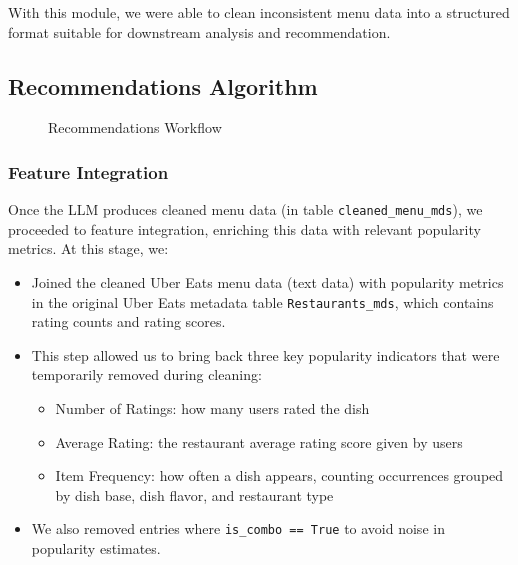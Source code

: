 \documentclass[
  11pt,
  a4paper,
  DIV=11,
  numbers=noendperiod]{scrartcl}
\providecommand{\tightlist}{%
  \setlength{\itemsep}{0pt}\setlength{\parskip}{0pt}}\usepackage{longtable,booktabs,array}
\begin{document}
With this module, we were able to clean inconsistent menu data into a
structured format suitable for downstream analysis and recommendation.

\subsection{Recommendations Algorithm}\label{recommendations-algorithm}

\begin{figure}

\caption{\label{fig-rec-flow}Recommendations Workflow}


\end{figure}%

\subsubsection{Feature Integration}\label{feature-integration}

Once the LLM produces cleaned menu data (in table
\texttt{cleaned\_menu\_mds}), we proceeded to feature integration,
enriching this data with relevant popularity metrics. At this stage, we:

\begin{itemize}
\tightlist
\item
  Joined the cleaned Uber Eats menu data (text data) with popularity
  metrics in the original Uber Eats metadata table
  \texttt{Restaurants\_mds}, which contains rating counts and rating
  scores.
\item
  This step allowed us to bring back three key popularity indicators
  that were temporarily removed during cleaning:

  \begin{itemize}
  \tightlist
  \item
    Number of Ratings: how many users rated the dish
  \item
    Average Rating: the restaurant average rating score given by users
  \item
    Item Frequency: how often a dish appears, counting occurrences
    grouped by dish base, dish flavor, and restaurant type\\
  \end{itemize}
\item
  We also removed entries where \texttt{is\_combo\ ==\ True} to avoid
  noise in popularity estimates.
\end{itemize}
\end{document}

